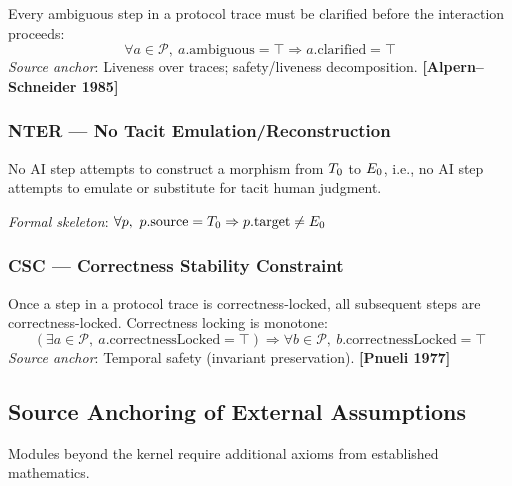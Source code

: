 \begin{axiom_env}
Every ambiguous step in a protocol trace must be clarified before the
interaction proceeds:
\[
  \forall a \in \mathcal{P},\
  a.\mathrm{ambiguous} = \top \Rightarrow a.\mathrm{clarified} = \top
\]
\emph{Source anchor}: Liveness over traces; safety/liveness decomposition.
\textbf{[Alpern--Schneider 1985]}
\end{axiom_env}

\subsubsection*{NTER --- No Tacit Emulation/Reconstruction}

\begin{axiom_env}
No AI step attempts to construct a morphism from $T_0$ to $E_0$, i.e.,
no AI step attempts to emulate or substitute for tacit human judgment.

\emph{Formal skeleton}:
$\forall p,\ p.\mathrm{source} = \Tobj \Rightarrow p.\mathrm{target} \neq \Eobj$

\end{axiom_env}

\subsubsection*{CSC --- Correctness Stability Constraint}

\begin{axiom_env}
Once a step in a protocol trace is correctness-locked, all subsequent steps are
correctness-locked. Correctness locking is monotone:
\[
  (\exists a \in \mathcal{P},\ a.\mathrm{correctnessLocked} = \top)
  \Rightarrow
  \forall b \in \mathcal{P},\ b.\mathrm{correctnessLocked} = \top
\]
\emph{Source anchor}: Temporal safety (invariant preservation).
\textbf{[Pnueli 1977]}
\end{axiom_env}

\subsection{Source Anchoring of External Assumptions}

Modules beyond the kernel require additional axioms from established mathematics.

